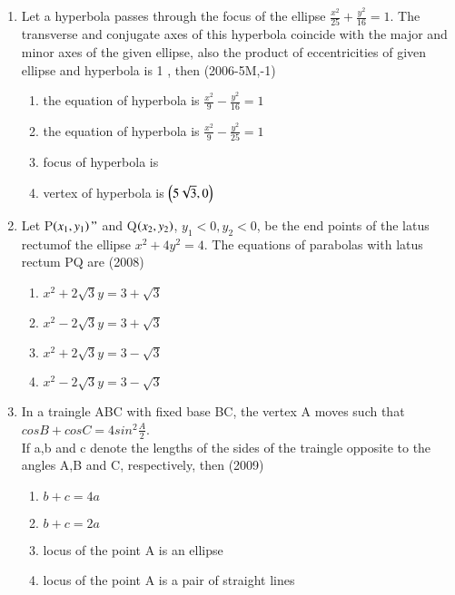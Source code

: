 \documentclass[journal,12pt,onecolumn]{IEEEtran}
\theoremstyle{remark}
\begin{document}
\begin{enumerate}
\item Let a hyperbola passes through the focus of the ellipse \textbf{$\frac{x^2}{25}+\frac{y^2}{16}=1$}. The transverse and conjugate axes of this hyperbola coincide with the major and minor axes of the given ellipse, also the product of eccentricities of given ellipse and hyperbola is 1 , then \hfill (2006-5M,-1)\\
	\begin{enumerate}
		\item the equation of hyperbola is $\frac{x^2}{9}-\frac{y^2}{16}=1$
		\item the equation of hyperbola is $\frac{x^2}{9}-\frac{y^2}{25}=1$
		\item focus of hyperbola is 
		\item vertex of hyperbola is $\left(5\sqrt{3},0\right)$
	\end{enumerate}

\item Let P$\left(x_{1},y_{1}\right)"$ and Q$\left(x_{2},y_{2}\right)$, $y_{1}<0,y_{2}<0$, be the end points of the latus rectumof the ellipse $x^2+4y^2=4$. The equations of parabolas with latus rectum PQ are \hfill(2008)\\
	\begin{enumerate}
		\item $x^2+2\sqrt{3}y=3+\sqrt{3}$
		\item $x^2-2\sqrt{3}y=3+\sqrt{3}$
		\item $x^2+2\sqrt{3}y=3-\sqrt{3}$
		\item $x^2-2\sqrt{3}y=3-\sqrt{3}$
	\end{enumerate}

\item In a traingle ABC with fixed base BC, the vertex A moves such that\\
	\hspace{1.5cm}$cosB+cosC=4sin^2\frac{A}{2}$.\\
		If a,b and c denote the lengths of the sides of the traingle opposite to the angles A,B and C, respectively, then \hfill(2009)\\
		\begin{enumerate}
			\item $b+c=4a$
			\item $b+c=2a$
			\item locus of the point A is an ellipse
			\item locus of the point A is a pair of straight lines
		\end{enumerate}


\end{enumerate}
\end{document}

